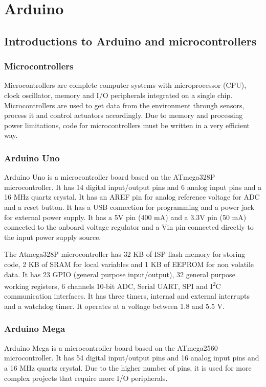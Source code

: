 \section{Arduino}
\subsection{Introductions to Arduino and microcontrollers}
\subsubsection*{Microcontrollers}
Microcontrollers are complete computer systems with microprocessor (CPU), clock oscillator, memory and I/O peripherals integrated
on a single chip. Microcontrollers are used to get data from the environment through sensors, process it and control actuators
accordingly. Due to memory and processing power limitations, code for microcontrollers must be written in a very efficient way.

\subsubsection*{Arduino Uno}
Arduino Uno is a microcontroller board based on the ATmega328P microcontroller. It has 14 digital input/output pins and 6 analog
input pins and a 16 MHz quartz crystal. It has an AREF pin for analog reference voltage for ADC and a reset button. It has a USB
connection for programming and a power jack for external power supply. It has a 5V pin (400 mA) and a 3.3V pin (50 mA) connected
to the onboard voltage regulator and a Vin pin connected directly to the input power supply source.

The Atmega328P microcontroller has 32 KB of ISP flash memory for storing code, 2 KB of SRAM for local variables and 1 KB of
EEPROM for non volatile data. It has 23 GPIO (general purpose input/output), 32 general purpose working registers, 6 channels
10-bit ADC, Serial UART, SPI and I\textsuperscript{2}C communication interfaces. It has three timers, internal and
external interrupts and a watchdog timer. It operates at a voltage between 1.8 and 5.5 V.

\subsubsection*{Arduino Mega}
Arduino Mega is a microcontroller board based on the ATmega2560 microcontroller. It has 54 digital input/output pins and 16
analog input pins and a 16 MHz quartz crystal. Due to the higher number of pins, it is used for more complex projects that
require more I/O peripherals.


